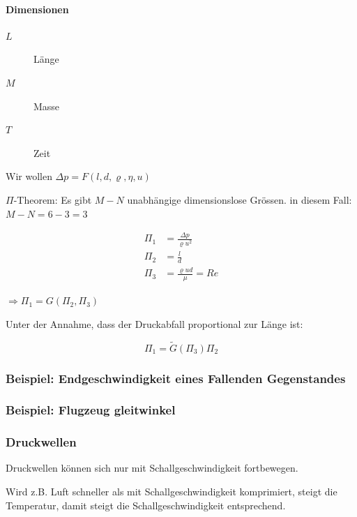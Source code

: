 \documentclass[a4paper]{scrartcl}
\begin{document}
\paragraph{Dimensionen}
\begin{description}
	\item[$L$] Länge
	\item[$M$] Masse
	\item[$T$] Zeit
\end{description}

Wir wollen $\Delta p = F(l, d, \varrho, \eta, u)$


$\Pi$-Theorem: Es gibt $M-N$ unabhängige dimensionslose Grössen. in diesem Fall: $M-N = 6-3 = 3$

\begin{align*}
\Pi_1 &= \frac{\Delta p}{\varrho u^2} \\
\Pi_2 &= \frac{l}{d} \\
\Pi_3 &= \frac{\varrho u d}{\mu} = Re
\end{align*}

$\Rightarrow \Pi_1 = G(\Pi_2, \Pi_3)$

Unter der Annahme, dass der Druckabfall proportional zur Länge ist:

\[
	\Pi_1 = \tilde{G}(\Pi_3)\Pi_2
\]



\subsubsection{Beispiel: Endgeschwindigkeit eines Fallenden Gegenstandes}


\subsubsection{Beispiel: Flugzeug gleitwinkel}



\subsubsection{Druckwellen}

Druckwellen können sich nur mit Schallgeschwindigkeit fortbewegen.

Wird z.B. Luft schneller als mit Schallgeschwindigkeit komprimiert, steigt die Temperatur, damit steigt die Schallgeschwindigkeit entsprechend.
\end{document}
